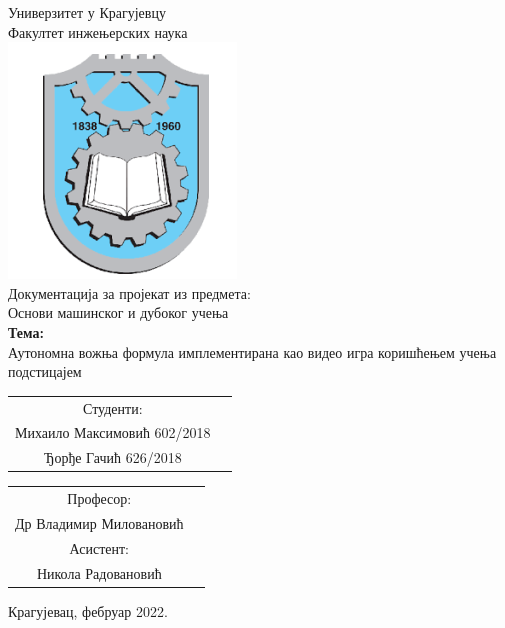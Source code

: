 \documentclass[12pt]{article}
\begin{document}
\thispagestyle{empty}
\begin{center}
\Large{
Универзитет у Крагујевцу
\vspace{0.3cm}\\
Факултет инжењерских наука
}
\vspace{0.7cm}\\
\includegraphics{images/fin_image}
\vspace{0.7cm}\\
\LARGE{
Документација за пројекат из предмета:
\vspace{0.1cm}\\
Основи машинског и дубоког учења
}
\vspace{1cm}\\
\LARGE{
\textbf{Тема:}
\vspace{0.3cm}\\
Аутономна вожња формула имплементирана као видео игра коришћењем учења подстицајем
}
\vspace{2.5cm}
\end{center}

\begin{tabular}{cc}
Студенти:\\
Михаило Максимовић 602/2018\\
Ђорђе Гачић 626/2018\\
\end{tabular}
\setlength{\tabcolsep}{12em}
\begin{tabular}{cc}
Професор:\\
Др Владимир Миловановић\\
Асистент:\\
Никола Радовановић\\
\end{tabular}
\begin{center}
\vspace{1cm}
Крагујевац, фебруар 2022.
\end{center}
\newpage
\end{document}
